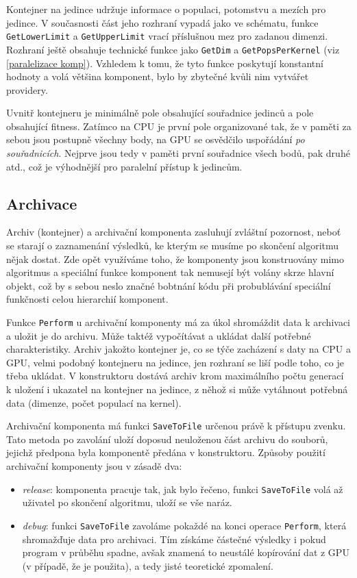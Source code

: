 Kontejner na jedince udržuje informace o populaci, potomstvu a mezích pro jedince. V současnosti část jeho rozhraní vypadá jako ve schématu, funkce \texttt{GetLowerLimit} a \texttt{GetUpperLimit} vrací příslušnou mez pro zadanou dimenzi. Rozhraní ještě obsahuje technické funkce jako \texttt{GetDim} a \texttt{GetPopsPerKernel} (viz \ref{paralelizace komp}). Vzhledem k tomu, že tyto funkce poskytují konstantní hodnoty a volá většina komponent, bylo by zbytečné kvůli nim vytvářet providery.

Uvnitř kontejneru je minimálně pole obsahující souřadnice jedinců a pole obsahující fitness. Zatímco na CPU je první pole organizované tak, že v paměti za sebou jsou postupně všechny body, na GPU se osvědčilo uspořádání \emph{po souřadnicích}. Nejprve jsou tedy v paměti první souřadnice všech bodů, pak druhé atd., což je výhodnější pro paralelní přístup k jedincům.

\subsection{Archivace}

Archiv (kontejner) a archivační komponenta zasluhují zvláštní pozornost, neboť se starají o zaznamenání výsledků, ke kterým se musíme po skončení algoritmu nějak dostat. Zde opět využíváme toho, že komponenty jsou konstruovány mimo algoritmus a speciální funkce komponent tak nemusejí být volány skrze hlavní objekt, což by s sebou neslo značné bobtnání kódu při probublávání speciální funkčnosti celou hierarchií komponent.

Funkce \texttt{Perform} u archivační komponenty má za úkol shromáždit data k archivaci a uložit je do archivu. Může taktéž vypočítávat a ukládat další potřebné charakteristiky. Archiv jakožto kontejner je, co se týče zacházení s daty na CPU a GPU, velmi podobný kontejneru na jedince, jen rozhraní se liší podle toho, co je třeba ukládat. V konstruktoru dostává archiv krom maximálního počtu generací k uložení i ukazatel na kontejner na jedince, z něhož si může vytáhnout potřebná data (dimenze, počet populací na kernel).
 
Archivační komponenta má funkci \texttt{SaveToFile} určenou právě k přístupu zvenku. Tato metoda po zavolání uloží doposud neuloženou část archivu do souborů, jejichž předpona byla komponentě předána v konstruktoru. Způsoby použití archivační komponenty jsou v zásadě dva:
\begin{itemize}
  \item \emph{release}: komponenta pracuje tak, jak bylo řečeno, funkci \texttt{SaveToFile} volá až uživatel po skončení algoritmu, uloží se vše naráz.
  \item \emph{debug}: funkci \texttt{SaveToFile} zavoláme pokaždé na konci operace \texttt{Perform}, která shromažďuje data pro archivaci. Tím získáme částečné výsledky i pokud program v průběhu spadne, avšak znamená to neustálé kopírování dat z GPU (v případě, že je použita), a tedy jisté teoretické zpomalení.
\end{itemize}

